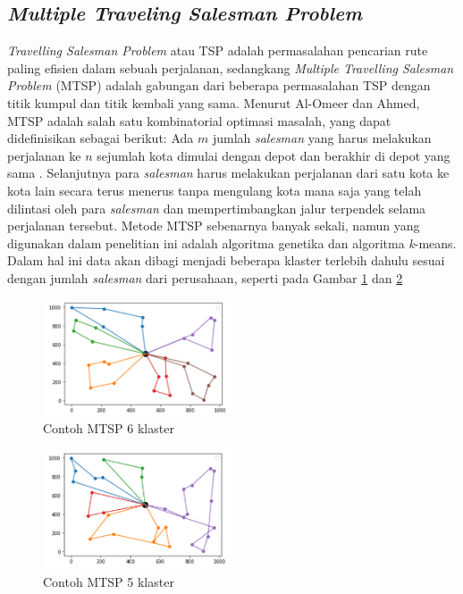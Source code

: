 \subsection{\textit{Multiple Traveling Salesman Problem}}

\textit{Travelling Salesman Problem} atau TSP adalah permasalahan pencarian rute paling efisien dalam sebuah perjalanan, sedangkang \textit{Multiple Travelling Salesman Problem} (MTSP) adalah gabungan dari beberapa permasalahan TSP dengan titik kumpul dan titik kembali yang sama. Menurut Al-Omeer dan Ahmed, MTSP adalah salah satu kombinatorial optimasi masalah, yang dapat didefinisikan sebagai berikut: Ada $m$ jumlah \textit{salesman} yang harus melakukan perjalanan ke $n$ sejumlah kota dimulai dengan depot dan berakhir di depot yang sama \cite{al2019comparative}. Selanjutnya para \textit{salesman} harus melakukan perjalanan dari satu kota ke kota lain secara terus menerus tanpa mengulang kota mana saja yang telah dilintasi oleh para \textit{salesman} dan mempertimbangkan jalur terpendek selama perjalanan tersebut. Metode MTSP sebenarnya banyak sekali, namun yang digunakan dalam penelitian ini adalah algoritma genetika dan algoritma \textit{k}-means. Dalam hal ini data akan dibagi menjadi beberapa klaster terlebih dahulu sesuai dengan jumlah \textit{salesman} dari perusahaan, seperti pada Gambar \ref{fig:mtsp6} dan \ref{fig:mtsp5}

\begin{figure}[H]
  \centering
  \includegraphics[width=0.5\textwidth]{Gambar/Picture1.png}
  \caption{Contoh MTSP 6 klaster}
  \label{fig:mtsp6}
\end{figure}

\begin{figure}[H]
  \centering
  \includegraphics[width=0.5\textwidth]{Gambar/Picture2.png}
  \caption{Contoh MTSP 5 klaster}
  \label{fig:mtsp5}
\end{figure}

